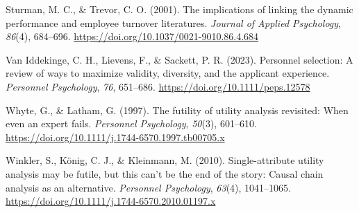 \documentclass[
  english,
  man]{apa6}
\newlength{\cslhangindent}
\newenvironment{CSLReferences}[2] %
 {\begin{list}{}{%
  \setlength{\itemindent}{0pt}
  \setlength{\leftmargin}{0pt}
  \setlength{\parsep}{0pt}
  \ifodd #1
   \setlength{\leftmargin}{\cslhangindent}
   \setlength{\itemindent}{-1\cslhangindent}
  \fi
  \setlength{\itemsep}{#2\baselineskip}}}
 {\end{list}}
\begin{document}
\begin{CSLReferences}{1}{0}
Sturman, M. C., \& Trevor, C. O. (2001). The implications of linking the dynamic performance and employee turnover literatures. \emph{Journal of Applied Psychology}, \emph{86}(4), 684--696. \url{https://doi.org/10.1037/0021-9010.86.4.684}

Van Iddekinge, C. H., Lievens, F., \& Sackett, P. R. (2023). Personnel selection: A review of ways to maximize validity, diversity, and the applicant experience. \emph{Personnel Psychology}, \emph{76}, 651--686. \url{https://doi.org/10.1111/peps.12578}

Whyte, G., \& Latham, G. (1997). The futility of utility analysis revisited: When even an expert fails. \emph{Personnel Psychology}, \emph{50}(3), 601--610. \url{https://doi.org/10.1111/j.1744-6570.1997.tb00705.x}

Winkler, S., König, C. J., \& Kleinmann, M. (2010). Single-attribute utility analysis may be futile, but this can't be the end of the story: Causal chain analysis as an alternative. \emph{Personnel Psychology}, \emph{63}(4), 1041--1065. \url{https://doi.org/10.1111/j.1744-6570.2010.01197.x}

\end{CSLReferences}
\end{document}

